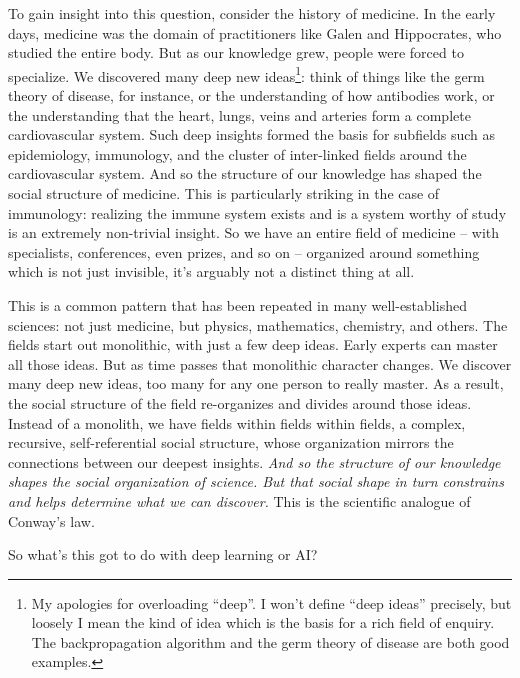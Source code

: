 \documentclass[a4paper,twoside,10pt]{book}
\begin{document}
To gain insight into this question, consider the history of medicine. In the early days, medicine was the domain of practitioners like Galen and Hippocrates, who studied the entire body. But as our knowledge grew, people were forced to specialize. We discovered many deep new ideas\footnote{My apologies for overloading ``deep''. I won't define ``deep ideas'' precisely, but loosely I mean the kind of idea which is the basis for a rich field of enquiry. The backpropagation algorithm and the germ theory of disease are both good examples.}: think of things like the germ theory of disease, for instance, or the understanding of how antibodies work, or the understanding that the heart, lungs, veins and arteries form a complete cardiovascular system. Such deep insights formed the basis for subfields such as epidemiology, immunology, and the cluster of inter-linked fields around the cardiovascular system. And so the structure of our knowledge has shaped the social structure of medicine. This is particularly striking in the case of immunology: realizing the immune system exists and is a system worthy of study is an extremely non-trivial insight. So we have an entire field of medicine -- with specialists, conferences, even prizes, and so on -- organized around something which is not just invisible, it's arguably not a distinct thing at all.

This is a common pattern that has been repeated in many well-established sciences: not just medicine, but physics, mathematics, chemistry, and others. The fields start out monolithic, with just a few deep ideas. Early experts can master all those ideas. But as time passes that monolithic character changes. We discover many deep new ideas, too many for any one person to really master. As a result, the social structure of the field re-organizes and divides around those ideas. Instead of a monolith, we have fields within fields within fields, a complex, recursive, self-referential social structure, whose organization mirrors the connections between our deepest insights. \textit{And so the structure of our knowledge shapes the social organization of science. But that social shape in turn constrains and helps determine what we can discover.} This is the scientific analogue of Conway's law.

So what's this got to do with deep learning or AI?
\end{document}
